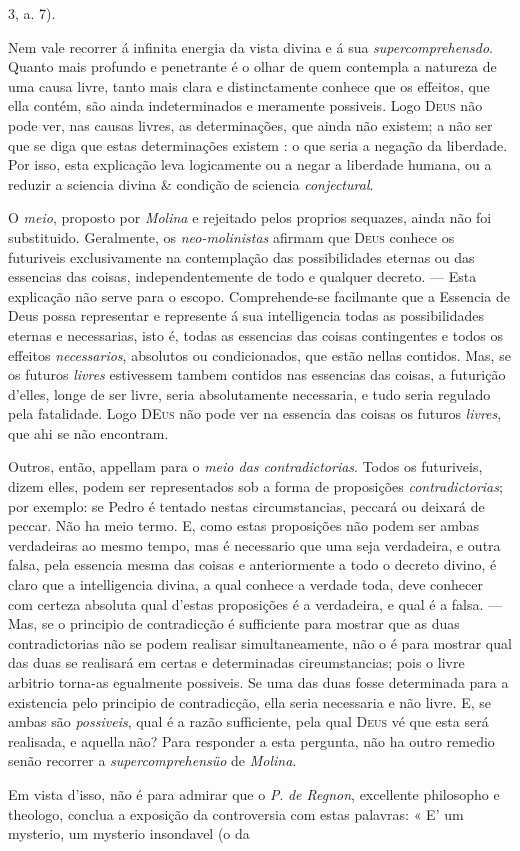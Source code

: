 3, a. 7).\par Nem vale recorrer á infinita energia da vista divina e á sua \emph{supercomprehensdo}. Quanto mais profundo e penetrante é o olhar de quem contempla a natureza de uma causa livre, tanto mais clara e distinctamente conhece que os effeitos, que ella contém, são ainda indeterminados e meramente possiveis. Logo \textsc{Deus} não pode ver, nas causas livres, as determinações, que ainda não existem; a não ser que se diga que estas determinações existem : o que seria a negação da liberdade. Por isso, esta explicação leva logicamente ou a negar a liberdade humana, ou a reduzir a sciencia divina \& condição de sciencia \emph{conjectural}.\par O \emph{meio}, proposto por \emph{Molina} e rejeitado pelos proprios sequazes, ainda não foi substituido. Geralmente, os \emph{neo-molinistas} afirmam que \textsc{Deus} conhece os futuriveis exclusivamente na contemplação das possibilidades eternas ou das essencias das coisas, independentemente de todo e qualquer decreto. --- Esta explicação não serve para o escopo. Comprehende-se facilmante que a Essencia de Deus possa representar e represente á sua intelligencia todas as possibilidades eternas e necessarias, isto é, todas as essencias das coisas contingentes e todos os effeitos \emph{necessarios}, absolutos ou condicionados, que estão nellas contidos. Mas, se os futuros \emph{livres} estivessem tambem contidos nas essencias das coisas, a futurição d'elles, longe de ser livre, seria absolutamente necessaria, e tudo seria regulado pela fatalidade. Logo \textsc{DEus} não pode ver na essencia das coisas os futuros \emph{livres}, que ahi se não encontram.\par Outros, então, appellam para o \emph{meio das contradictorias}. Todos os futuriveis, dizem elles, podem ser representados sob a forma de proposições \emph{contradictorias}; por exemplo: se Pedro é tentado nestas circumstancias, peccará ou deixará de peccar. Não ha meio termo. E, como estas proposições não podem ser ambas verdadeiras ao mesmo tempo, mas é necessario que uma seja verdadeira, e outra falsa, pela essencia mesma das coisas e anteriormente a todo o decreto divino, é claro que a intelligencia divina, a qual conhece a verdade toda, deve conhecer com certeza absoluta qual d'estas proposições é a verdadeira, e qual é a falsa. --- Mas, se o principio de contradicção é sufficiente para mostrar que as duas contradictorias não se podem realisar simultaneamente, não o é para mostrar qual das duas se realisará em certas e determinadas cireumstancias; pois o livre arbitrio torna-as egualmente possiveis. Se uma das duas fosse determinada para a existencia pelo principio de contradicção, ella seria necessaria e não livre. E, se ambas são \emph{possiveis}, qual é a razão sufficiente, pela qual \textsc{Deus} vé que esta será realisada, e aquella não? Para responder a esta pergunta, não ha outro remedio senão recorrer a \emph{supercomprehensüo} de \emph{Molina}.\par Em vista d'isso, não é para admirar que o \emph{P}. \emph{de Regnon}, excellente philosopho e theologo, conclua a exposição da controversia com estas palavras: « E' um mysterio, um mysterio insondavel (o da 